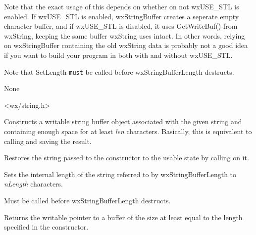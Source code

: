 Note that the exact usage of this depends on whether on not wxUSE\_STL is enabled.  If
wxUSE\_STL is enabled, wxStringBuffer creates a seperate empty character buffer, and
if wxUSE\_STL is disabled, it uses GetWriteBuf() from wxString, keeping the same buffer
wxString uses intact.  In other words, relying on wxStringBuffer containing the old 
wxString data is probably not a good idea if you want to build your program in both
with and without wxUSE\_STL.

Note that SetLength {\tt must} be called before wxStringBufferLength destructs.


None


<wx/string.h>


\label{wxstringbufferlengthctor}


Constructs a writable string buffer object associated with the given string
and containing enough space for at least {\it len} characters. Basically, this
is equivalent to calling  and
saving the result.

\label{wxstringbufferlengthdtor}


Restores the string passed to the constructor to the usable state by calling 
 on it.

\label{wxstringbufferlengthsetlength}


Sets the internal length of the string referred to by wxStringBufferLength to 
{\it nLength} characters.

Must be called before wxStringBufferLength destructs.

\label{wxstringbufferlengthwxchar}


Returns the writable pointer to a buffer of the size at least equal to the
length specified in the constructor.


